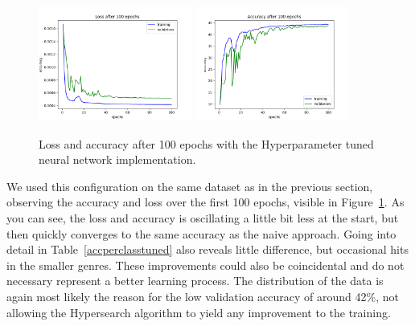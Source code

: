 \begin{figure}
	\centering
	\includegraphics[width=0.45\textwidth]{images/tunedloss.png}
	\centering
	\quad\includegraphics[width=0.45\textwidth]{images/tunedacc.png}
	\caption{Loss and accuracy after 100 epochs with the Hyperparameter
	tuned neural network implementation.}
	\label{tunedloss}
\end{figure}
We used this configuration on the same dataset as in the previous
section, observing the accuracy and loss over the first 100 epochs,
visible in Figure~\ref{tunedloss}. As you can see, the loss and accuracy
is oscillating a little bit less at the start, but then quickly
converges to the same accuracy as the naive approach. Going into detail
in Table~\ref{accperclasstuned} also reveals little difference, but
occasional hits in the smaller genres. These improvements could also be
coincidental and do not necessary represent a better learning process.
The distribution of the data is again most likely the reason for the low
validation accuracy of around 42\%, not allowing the Hypersearch
algorithm to yield any improvement to the training.


